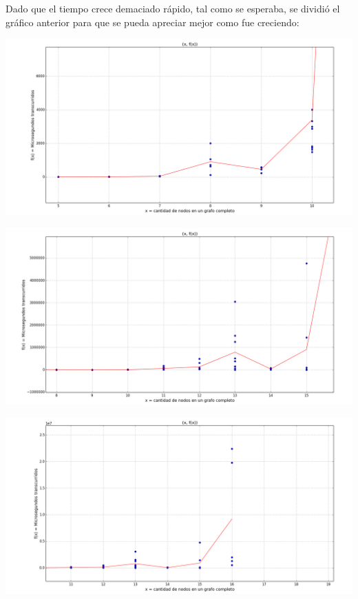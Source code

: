 Dado que el tiempo crece demaciado r\'apido, tal como se esperaba, se dividi\'o el gr\'afico anterior para que se pueda apreciar mejor como fue creciendo:
\begin{center}
	\includegraphics[scale=0.41]{img/exacto/fx_n_5_10.png}
\end{center}

\begin{center}
	\includegraphics[scale=0.41]{img/exacto/fx_n_8_15.png}
\end{center}

\begin{center}
	\includegraphics[scale=0.41]{img/exacto/fx_n_11_16.png}
\end{center}

